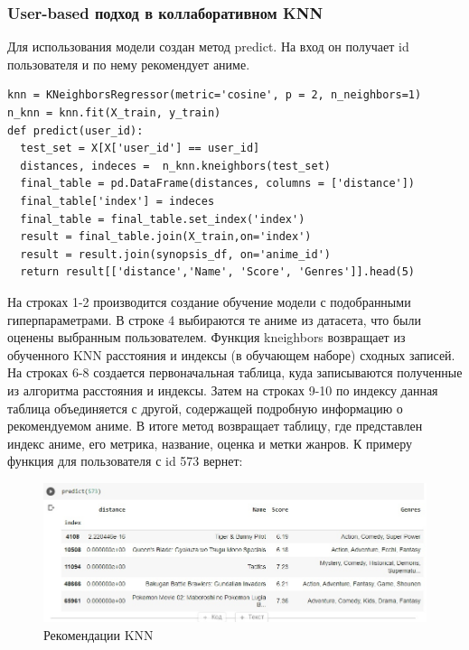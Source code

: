 \documentclass[bachelor, och, diploma]{SCWorks}
\begin{document}
\subsubsection{User-based подход в коллаборативном KNN}
Для использования модели создан метод predict. На вход он получает id пользователя и по нему рекомендует аниме. 

\begin{verbatim}
knn = KNeighborsRegressor(metric='cosine', p = 2, n_neighbors=1)
n_knn = knn.fit(X_train, y_train)
def predict(user_id):
  test_set = X[X['user_id'] == user_id]
  distances, indeces =  n_knn.kneighbors(test_set)
  final_table = pd.DataFrame(distances, columns = ['distance'])
  final_table['index'] = indeces
  final_table = final_table.set_index('index')
  result = final_table.join(X_train,on='index')
  result = result.join(synopsis_df, on='anime_id')
  return result[['distance','Name', 'Score', 'Genres']].head(5)
\end{verbatim}

На строках 1-2 производится создание обучение модели с подобранными гиперпараметрами. В строке 4 выбираются те аниме из датасета, что были оценены выбранным пользователем. Функция kneighbors возвращает из обученного KNN расстояния и индексы (в обучающем наборе) сходных записей. На строках 6-8 создается первоначальная таблица, куда записываются полученные из алгоритма расстояния и индексы.
 Затем на строках 9-10 по индексу данная таблица объединяется с другой, 
 содержащей подробную информацию о рекомендуемом аниме.
  В итоге метод возвращает таблицу, где представлен индекс аниме,
   его метрика, название, оценка и метки жанров. К примеру функция для пользователя с id 573 вернет:

   \begin{figure}[h]

	\centering
	
	\includegraphics[width=0.8\linewidth]{res2.png}
	
	\caption{Рекомендации KNN}
	
	\label{fig:r2}
	
\end{figure}
\end{document}
